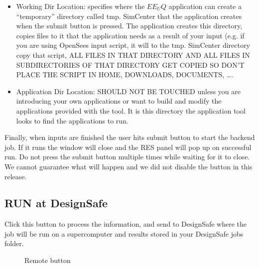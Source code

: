 \begin{itemize}
\item Working Dir Location: specifies where the $EE_UQ$ application can create a “temporary” directory called tmp. SimCenter that the application 
creates when the submit button is pressed. The application creates this directory, copies files to it that the application needs as a result of your 
input (e.g. if you are using OpenSees input script, it will to the tmp. SimCenter directory copy that script, ALL FILES IN THAT DIRECTORY AND ALL FILES IN 
SUBDIRECTORIES OF THAT DIRECTORY GET COPIED SO DON’T PLACE THE SCRIPT IN HOME, DOWNLOADS, DOCUMENTS, ….
\item Application Dir Location: SHOULD NOT BE TOUCHED unless you are introducing your own applications or want to build and modify the 
applications provided with the tool. It is this directory the application tool looks to find the applications to run.
\end{itemize}


Finally, when inputs are finished the user hits submit button to start the backend job. If it runs the window will close and the RES 
panel will pop up on successful run. Do not press the submit button multiple times while waiting for it to close. We cannot guarantee 
what will happen and we did not disable the button in this release.

\subsection{RUN at DesignSafe}
Click this button to process the information, and send to DesignSafe where the job will be run on a supercomputer and results stored in your DesignSafe jobs folder.

\begin{figure}[!htbp]
  \caption{Remote button}
  \label{fig:figure16}
\end{figure}

